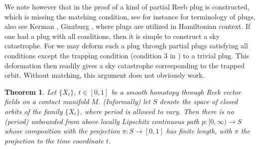 \documentclass{amsart}
\numberwithin{equation}{section}
\newtheorem{theorem}{Theorem}
\theoremstyle{definition}
\theoremstyle{remark}
\begin{document}
We note however that in the proof of \cite[Theorem 1.19]{citeKerman2017} a kind of partial Reeb plug is constructed, which is missing the matching condition, see for instance \cite{citeKKuperbergSmoothCounterexample} for terminology of plugs, also see Kerman \cite{citeKermanHamiltonianSeifert}, Ginzburg \cite{citeGinzburgHamiltonianSeifert}, where plugs are utilized in Hamiltonian context.
If one had a plug with all conditions, then it is simple to construct a sky catastrophe. For we may deform such a plug through partial plugs satisfying all conditions except the trapping condition (condition 3 in \cite{citeKKuperbergSmoothCounterexample}) to a trivial plug. This deformation then readily gives a sky catastrophe corresponding to the trapped orbit.
Without matching, this argument does not obviously work.
%
\begin{theorem} \cite{citeSavelyevFuller} \label{prop:AdmissibleReeb} Let $\{X _{t} \}$, $t \in [0,1]$ be a smooth homotopy through Reeb
vector fields on a contact manifold $M$. (Informally) let $S$ denote the space of closed orbits of the family $\{X _{t} \}$, where period is allowed to vary.
Then there is no (period) unbounded from above locally Lipschitz  continuous path $p: [0,\infty)
\to S$ whose composition with the projection $\pi: S
\to [0,1]$ has finite length, with $\pi$ the projection to the time coordinate $t$.
\end{theorem}
\end{document}
